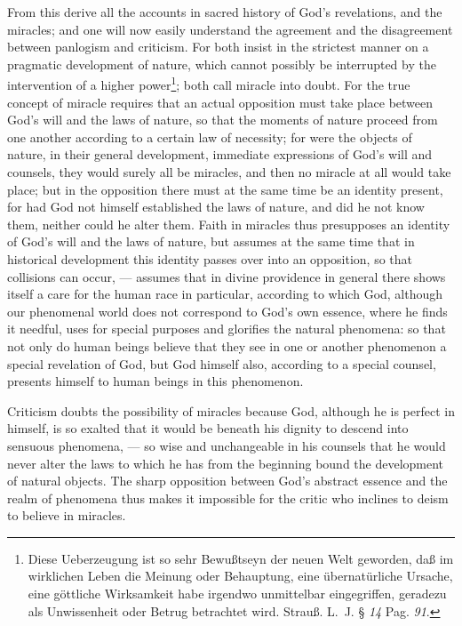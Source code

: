\documentclass[12pt]{book}
\newcommand{\opage}[1]{\marginnote{\footnotesize\textit{[#1]}}}
\begin{document}
From this derive all the accounts in sacred history of God's revelations, and
the miracles; and one will now easily understand the agreement and the
disagreement between panlogism and criticism. For both insist in the strictest
manner on a pragmatic development of nature, which cannot possibly be
interrupted by the intervention of a higher power\footnote{Diese Ueberzeugung ist so sehr Bewußtseyn der
neuen Welt geworden, daß im wirklichen Leben die Meinung oder Behauptung, eine
übernatürliche Ursache, eine göttliche Wirksamkeit habe irgendwo unmittelbar
eingegriffen, geradezu als Unwissenheit oder Betrug betrachtet wird. Strauß.
L.~J. § \textit{14} Pag. \textit{91}.}; both call miracle into doubt. For the
true concept of miracle requires that an actual opposition must take place
between God's will and the laws of nature, so that the moments of nature
proceed from one another according to a certain law of necessity; for were the
objects of nature, in their general development, immediate expressions of
God's will and counsels, they would surely all be miracles, and then no miracle
at all would take place; but in the opposition there must at the same time be
an identity present, for had God not himself established the laws of nature,
and did he not know them, neither could he alter them. Faith in miracles thus
presupposes an identity of God's will and the laws of nature, but assumes at
the same time that in historical development this identity passes over into an
opposition, so that collisions can occur, --- assumes that in divine providence
in general there shows itself a care for the human race in particular,
according to which God, although our phenomenal world does not correspond to
God's own essence, where he finds it needful, uses for special purposes and
\opage{130} glorifies the natural phenomena: so that not only do human beings
believe that they see in one or another phenomenon a special revelation of God,
but God himself also, according to a special counsel, presents himself to human
beings in this phenomenon.

Criticism doubts the possibility of miracles because God, although he is
perfect in himself, is so exalted that it would be beneath his dignity to
descend into sensuous phenomena, --- so wise and unchangeable in his counsels
that he would never alter the laws to which he has from the beginning bound the
development of natural objects. The sharp opposition between God's abstract
essence and the realm of phenomena thus makes it impossible for the critic who
inclines to deism to believe in miracles.
\end{document}
